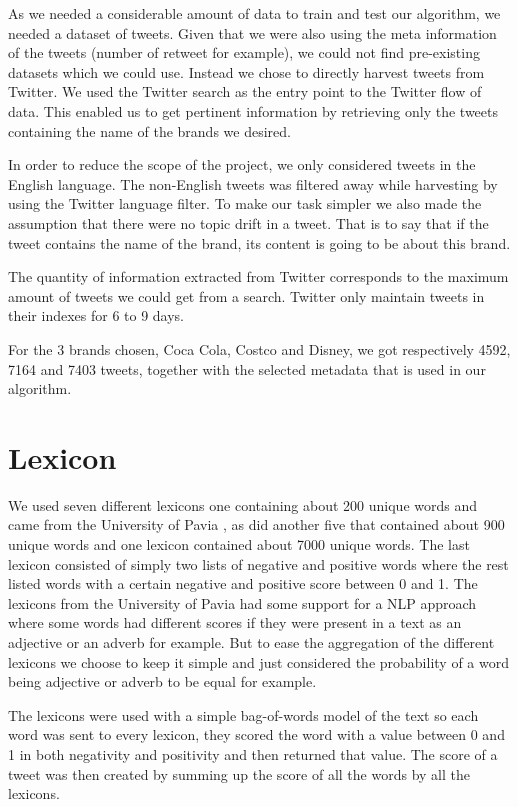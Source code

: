 \documentclass[a4paper,12pt]{report}
\begin{document}
As we needed a considerable amount of data to train and test our algorithm, we needed a dataset of tweets. 
Given that we were also using the meta information of the tweets (number of retweet for example), we could not find pre-existing datasets which we could use.
Instead we chose to directly harvest tweets from Twitter.
We used the Twitter search as the entry point to the Twitter flow of data. 
This enabled us to get pertinent information by retrieving only the tweets containing the name of the brands we desired.

In order to reduce the scope of the project, we only considered tweets in the English language. 
The non-English tweets was filtered away while harvesting by using the Twitter language filter.
To make our task simpler we also made the assumption that there were no topic drift in a tweet. 
That is to say that if the tweet contains the name of the brand, its content is going to be about this brand.

The quantity of information extracted from Twitter corresponds to the maximum amount of tweets we could get from a search.
Twitter only maintain tweets in their indexes for 6 to 9 days.

For the 3 brands chosen, Coca Cola, Costco and Disney, we got respectively 4592, 7164 and 7403 tweets, together with the selected metadata that is used in our algorithm.

\section{Lexicon}

We used seven different lexicons one containing about 200 unique words and came from the University of Pavia \cite{WNOP}, as did another five that contained about 900 unique words and one lexicon contained about 7000 unique words. 
The last lexicon consisted of simply two lists of negative and positive words where the rest listed words with a certain negative and positive score between 0 and 1. 
The lexicons from the University of Pavia had some support for a NLP approach where some words had different scores if they were present in a text as an adjective or an adverb for example.  
But to ease the aggregation of the different lexicons we choose to keep it simple and just considered the probability of a word being adjective or adverb to be equal for example.

The lexicons were used with a simple bag-of-words model of the text so each word was sent to every lexicon, they scored the word with a value between 0 and 1 in both negativity and positivity and then returned that value. 
The score of a tweet was then created by summing up the score of all the words by all the lexicons.
\end{document}
